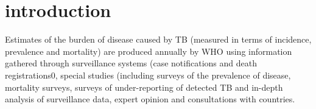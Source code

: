\section{introduction}

Estimates of the burden of disease caused by TB (measured in terms of incidence, prevalence and mortality) are produced annually by WHO using information gathered through surveillance systems (case notifications and death registrations0, special studies (including surveys of the prevalence of disease, mortality surveys, surveys of under-reporting of detected TB and in-depth analysis of surveillance data, expert opinion and consultations with countries. 
  